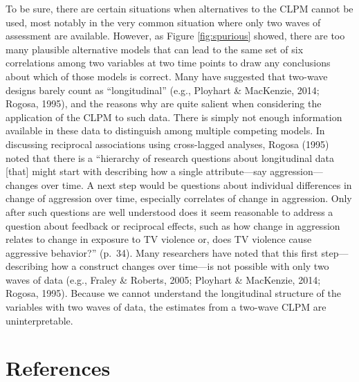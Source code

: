 \documentclass[
  english,
  man,floatsintext]{apa6}
\begin{document}
To be sure, there are certain situations when alternatives to the CLPM cannot be used, most notably in the very common situation where only two waves of assessment are available. However, as Figure \ref{fig:spurious} showed, there are too many plausible alternative models that can lead to the same set of six correlations among two variables at two time points to draw any conclusions about which of those models is correct. Many have suggested that two-wave designs barely count as ``longitudinal'' (e.g., Ployhart \& MacKenzie, 2014; Rogosa, 1995), and the reasons why are quite salient when considering the application of the CLPM to such data. There is simply not enough information available in these data to distinguish among multiple competing models. In discussing reciprocal associations using cross-lagged analyses, Rogosa (1995) noted that there is a ``hierarchy of research questions about longitudinal data {[}that{]} might start with describing how a single attribute---say aggression---changes over time. A next step would be questions about individual differences in change of aggression over time, especially correlates of change in aggression. Only after such questions are well understood does it seem reasonable to address a question about feedback or reciprocal effects, such as how change in aggression relates to change in exposure to TV violence or, does TV violence cause aggressive behavior?'' (p.~34). Many researchers have noted that this first step---describing how a construct changes over time---is not possible with only two waves of data (e.g., Fraley \& Roberts, 2005; Ployhart \& MacKenzie, 2014; Rogosa, 1995). Because we cannot understand the longitudinal structure of the variables with two waves of data, the estimates from a two-wave CLPM are uninterpretable.

\hypertarget{references}{%
\section*{References}\label{references}}
\end{document}
